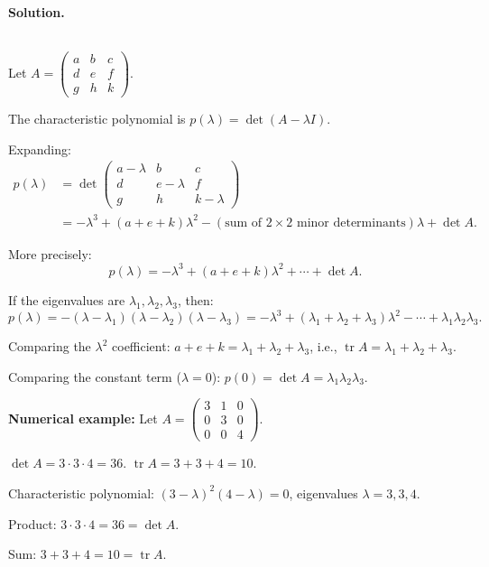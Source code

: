 \documentclass{article}
\DeclareMathOperator{\tr}{tr}
\begin{document}
\noindent\\
\textbf{Solution.}\\
\quad\\
\begin{mdframed}[linewidth=1pt]
Let $A = \begin{pmatrix} a & b & c \\ d & e & f \\ g & h & k \end{pmatrix}$.

The characteristic polynomial is $p(\lambda) = \det(A - \lambda I)$.

Expanding:
\begin{align*}
p(\lambda) &= \det\begin{pmatrix} a - \lambda & b & c \\ d & e - \lambda & f \\ g & h & k - \lambda \end{pmatrix} \\
&= -\lambda^3 + (a + e + k)\lambda^2 - (\text{sum of }2\times 2\text{ minor determinants})\lambda + \det A.
\end{align*}

More precisely:
\[
p(\lambda) = -\lambda^3 + (a+e+k)\lambda^2 + \cdots + \det A.
\]

If the eigenvalues are $\lambda_1, \lambda_2, \lambda_3$, then:
\[
p(\lambda) = -(\lambda - \lambda_1)(\lambda - \lambda_2)(\lambda - \lambda_3) = -\lambda^3 + (\lambda_1 + \lambda_2 + \lambda_3)\lambda^2 - \cdots + \lambda_1\lambda_2\lambda_3.
\]

Comparing the $\lambda^2$ coefficient: $a + e + k = \lambda_1 + \lambda_2 + \lambda_3$, i.e., $\tr A = \lambda_1 + \lambda_2 + \lambda_3$. \checkmark

Comparing the constant term ($\lambda = 0$): $p(0) = \det A = \lambda_1\lambda_2\lambda_3$. \checkmark

\medskip
\textbf{Numerical example:} Let $A = \begin{pmatrix} 3 & 1 & 0 \\ 0 & 3 & 0 \\ 0 & 0 & 4 \end{pmatrix}$.

$\det A = 3 \cdot 3 \cdot 4 = 36$. $\tr A = 3 + 3 + 4 = 10$.

Characteristic polynomial: $(3-\lambda)^2(4-\lambda) = 0$, eigenvalues $\lambda = 3, 3, 4$.

Product: $3 \cdot 3 \cdot 4 = 36 = \det A$. \checkmark

Sum: $3 + 3 + 4 = 10 = \tr A$. \checkmark
\end{mdframed}
\end{document}
